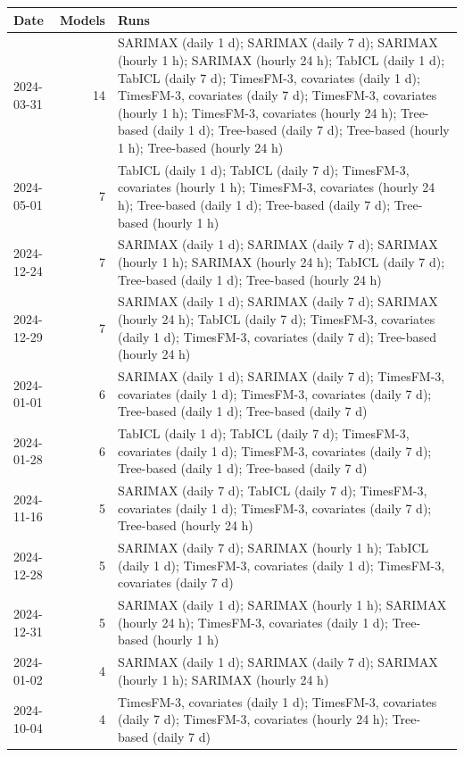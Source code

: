 \begin{tabular}{lrl}
\toprule
Date & Models & Runs \\
\midrule
2024-03-31 & 14 & SARIMAX (daily 1 d); SARIMAX (daily 7 d); SARIMAX (hourly 1 h); SARIMAX (hourly 24 h); TabICL (daily 1 d); TabICL (daily 7 d); TimesFM-3, covariates (daily 1 d); TimesFM-3, covariates (daily 7 d); TimesFM-3, covariates (hourly 1 h); TimesFM-3, covariates (hourly 24 h); Tree-based (daily 1 d); Tree-based (daily 7 d); Tree-based (hourly 1 h); Tree-based (hourly 24 h) \\
2024-05-01 & 7 & TabICL (daily 1 d); TabICL (daily 7 d); TimesFM-3, covariates (hourly 1 h); TimesFM-3, covariates (hourly 24 h); Tree-based (daily 1 d); Tree-based (daily 7 d); Tree-based (hourly 1 h) \\
2024-12-24 & 7 & SARIMAX (daily 1 d); SARIMAX (daily 7 d); SARIMAX (hourly 1 h); SARIMAX (hourly 24 h); TabICL (daily 7 d); Tree-based (daily 1 d); Tree-based (hourly 24 h) \\
2024-12-29 & 7 & SARIMAX (daily 1 d); SARIMAX (daily 7 d); SARIMAX (hourly 24 h); TabICL (daily 7 d); TimesFM-3, covariates (daily 1 d); TimesFM-3, covariates (daily 7 d); Tree-based (hourly 24 h) \\
2024-01-01 & 6 & SARIMAX (daily 1 d); SARIMAX (daily 7 d); TimesFM-3, covariates (daily 1 d); TimesFM-3, covariates (daily 7 d); Tree-based (daily 1 d); Tree-based (daily 7 d) \\
2024-01-28 & 6 & TabICL (daily 1 d); TabICL (daily 7 d); TimesFM-3, covariates (daily 1 d); TimesFM-3, covariates (daily 7 d); Tree-based (daily 1 d); Tree-based (daily 7 d) \\
2024-11-16 & 5 & SARIMAX (daily 7 d); TabICL (daily 7 d); TimesFM-3, covariates (daily 1 d); TimesFM-3, covariates (daily 7 d); Tree-based (hourly 24 h) \\
2024-12-28 & 5 & SARIMAX (daily 7 d); SARIMAX (hourly 1 h); TabICL (daily 1 d); TimesFM-3, covariates (daily 1 d); TimesFM-3, covariates (daily 7 d) \\
2024-12-31 & 5 & SARIMAX (daily 1 d); SARIMAX (hourly 1 h); SARIMAX (hourly 24 h); TimesFM-3, covariates (daily 1 d); Tree-based (hourly 1 h) \\
2024-01-02 & 4 & SARIMAX (daily 1 d); SARIMAX (daily 7 d); SARIMAX (hourly 1 h); SARIMAX (hourly 24 h) \\
2024-10-04 & 4 & TimesFM-3, covariates (daily 1 d); TimesFM-3, covariates (daily 7 d); TimesFM-3, covariates (hourly 24 h); Tree-based (daily 7 d) \\

\end{tabular}
